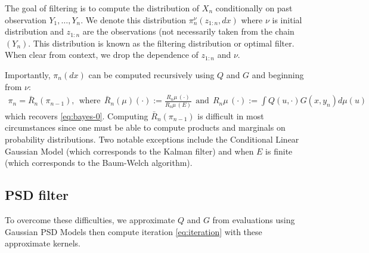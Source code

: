The goal of filtering is to compute the distribution of $X_n$ conditionally on past observation $Y_1, \ldots, Y_n$. We denote this distribution $\pi_n^\nu(z_{1:n}, dx)$ where $\nu$ is initial distribution and $z_{1:n}$ are the observations (not necessarily taken from the chain $(Y_n)$. This distribution is known as the filtering distribution or optimal filter. When clear from context, we drop the dependence of $z_{1:n}$ and $\nu$.

Importantly, $\pi_n(dx)$ can be computed recursively using $Q$ and $G$ and beginning from $\nu$:
\begin{align}\label{eq:iteration}
\pi_n = \bar{R}_n(\pi_{n-1}), ~~\textrm{where}~~ \bar{R}_n(\mu)(\cdot) := \frac{R_n \mu \, (\cdot)}{R_n\mu\,(E)} ~~\textrm{and}~~  R_n \mu \, (\cdot) := \int Q(u, \cdot)G(x, y_n) d\mu(u)
\end{align}
which recovers \cref{eq:bayes-0}. Computing $\bar R_n(\pi_{n-1})$ is difficult in most circumstances since one must be able to compute products and marginals on probability distributions. Two notable exceptions include the Conditional Linear Gaussian Model (which corresponds to the Kalman filter) and when $E$ is finite (which corresponds to the Baum-Welch algorithm).


\subsection{PSD filter}\label{sec:psdfilter}
To overcome these difficulties, we approximate $Q$ and $G$ from evaluations using Gaussian PSD Models then compute iteration \cref{eq:iteration} with these approximate kernels.

